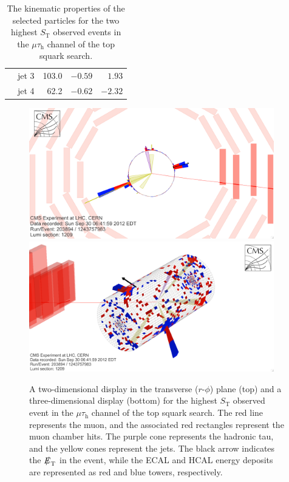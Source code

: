 \documentclass[12pt]{thesis}  %
\newcommand{\tauh}{\ensuremath{\tau_{\text{h}}}\xspace}
\newcommand{\mutau}{\ensuremath{\mu\tauh}\xspace}
\def\eslash{\ensuremath{{\hbox{$E$\kern-0.6em\lower-.05ex\hbox{/}\kern0.10em}}}}
\def\met{\mbox{$\eslash_\text{T}$}\xspace} %
\def\ST{\ensuremath{S_{\text{T}}}\xspace}
\begin{document}
\begin{table}[htbp]
\begin{tabular}{|r|l|r|r|r|}
                                           & jet 3                         &  103.0                              & $-0.59$                     & $ 1.93$ \\
                                           & jet 4                         &   62.2                              & $-0.62$                     & $-2.32$ \\
      \hline
    \end{tabular}
    \caption{The kinematic properties of the selected particles for the two highest \ST observed events in the \mutau channel of the top squark search.}    
    \label{tab:lqd-evt}
\end{table}

\begin{figure}[hbtp]
\begin{center}
\includegraphics[width=0.95\textwidth]{figures/eventdisplays/LQD_evt1_rphi.png}
\includegraphics[width=0.95\textwidth]{figures/eventdisplays/LQD_evt1_3D.png}
\caption{A two-dimensional display in the transverse ($r$-$\phi$) plane (top) and a three-dimensional display (bottom) for the highest \ST observed event in the \mutau channel of the top squark search. The red line represents the muon, and the associated red rectangles represent the muon chamber hits. The purple cone represents the hadronic tau, and the yellow cones represent the jets. The black arrow indicates the \met in the event, while the ECAL and HCAL energy deposits are represented as red and blue towers, respectively. }
\label{fig:lqd-evt1}
\end{center}
\end{figure}
\end{document}
